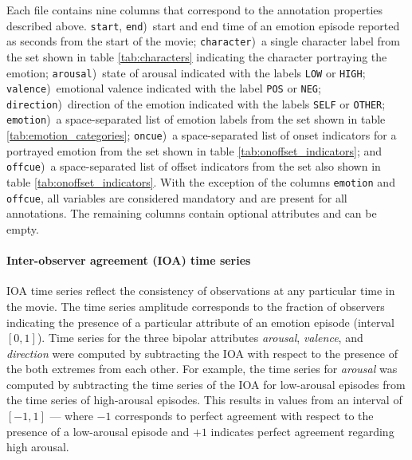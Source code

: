 \documentclass[10pt,a4paper,twocolumn]{article}
\begin{document}
Each file contains nine columns that correspond to the annotation properties
described above. \texttt{start}, \texttt{end})~start and end time of an emotion
episode reported as seconds from the start of the movie; \texttt{character})~a
single character label from the set shown in table \ref{tab:characters}
indicating the character portraying the emotion; \texttt{arousal})~state of
arousal indicated with the labels \texttt{LOW} or \texttt{HIGH};
\texttt{valence})~emotional valence indicated with the label \texttt{POS} or
\texttt{NEG}; \texttt{direction})~direction of the emotion indicated with the
labels \texttt{SELF} or \texttt{OTHER}; \texttt{emotion})~a space-separated list
of emotion labels from the set shown in table \ref{tab:emotion_categories};
\texttt{oncue})~a space-separated list of onset indicators for a portrayed
emotion from the set shown in table \ref{tab:onoffset_indicators}; and
\texttt{offcue})~a space-separated list of offset indicators from the set also
shown in table \ref{tab:onoffset_indicators}. With the exception of the
columns \texttt{emotion} and \texttt{offcue}, all variables are considered
mandatory and are present for all annotations. The remaining columns contain
optional attributes and can be empty.

\paragraph{Inter-observer agreement (IOA) time series} IOA time series reflect
the consistency of observations at any particular time in the movie. The time
series amplitude corresponds to the fraction of observers indicating the
presence of a particular attribute of an emotion episode (interval $[0,1]$). Time
series for the three bipolar attributes \textit{arousal}, \textit{valence}, and
\textit{direction} were computed by subtracting the IOA with respect to the
presence of the both extremes from each other. For example, the time series
for \textit{arousal} was computed by subtracting the time series of the IOA for
low-arousal episodes from the time series of high-arousal episodes. This
results in values from an interval of $[-1,1]$ --- where $-1$ corresponds to perfect
agreement with respect to the presence of a low-arousal episode and $+1$ indicates
perfect agreement regarding high arousal.
\end{document}

